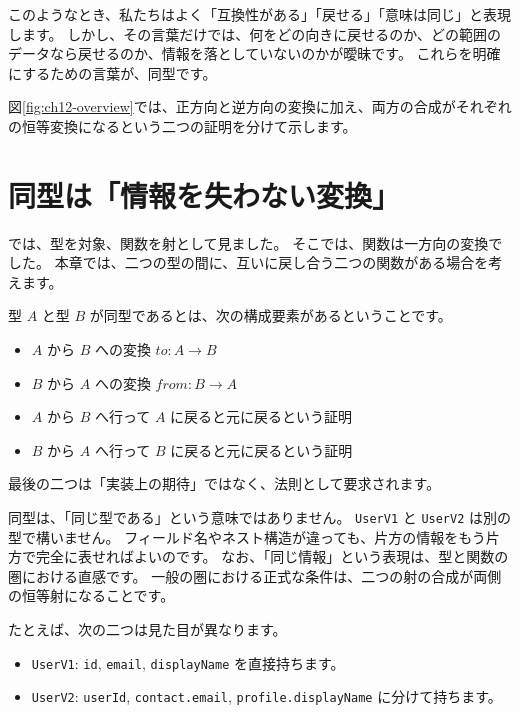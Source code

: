 このようなとき、私たちはよく「互換性がある」「戻せる」「意味は同じ」と表現します。
しかし、その言葉だけでは、何をどの向きに戻せるのか、どの範囲のデータなら戻せるのか、情報を落としていないのかが曖昧です。
これらを明確にするための言葉が、同型です。

図\ref{fig:ch12-overview}では、正方向と逆方向の変換に加え、両方の合成がそれぞれの恒等変換になるという二つの証明を分けて示します。


\section{同型は「情報を失わない変換」}
\label{sec:ch12-information-preserving}

では、型を対象、関数を射として見ました。
そこでは、関数は一方向の変換でした。
本章では、二つの型の間に、互いに戻し合う二つの関数がある場合を考えます。

型 $A$ と型 $B$ が同型であるとは、次の構成要素があるということです。

\begin{itemize}
\item $A$ から $B$ への変換 $\mathit{to} : A \to B$
\item $B$ から $A$ への変換 $\mathit{from} : B \to A$
\item $A$ から $B$ へ行って $A$ に戻ると元に戻るという証明
\item $B$ から $A$ へ行って $B$ に戻ると元に戻るという証明
\end{itemize}

最後の二つは「実装上の期待」ではなく、法則として要求されます。

同型は、「同じ型である」という意味ではありません。
\texttt{UserV1} と \texttt{UserV2} は別の型で構いません。
フィールド名やネスト構造が違っても、片方の情報をもう片方で完全に表せればよいのです。
なお、「同じ情報」という表現は、型と関数の圏における直感です。
一般の圏における正式な条件は、二つの射の合成が両側の恒等射になることです。

たとえば、次の二つは見た目が異なります。

\begin{itemize}
\item \texttt{UserV1}: \texttt{id}, \texttt{email}, \texttt{displayName} を直接持ちます。
\item \texttt{UserV2}: \texttt{userId}, \texttt{contact.email}, \texttt{profile.displayName} に分けて持ちます。
\end{itemize}

